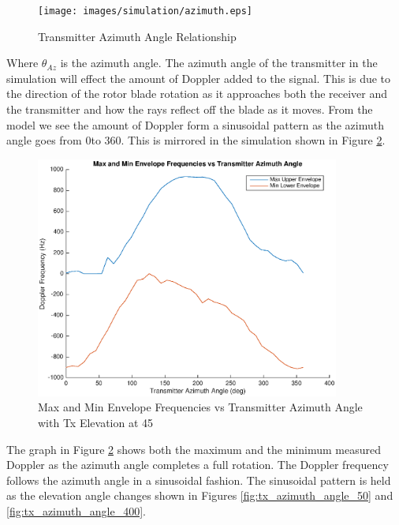 \begin{figure}
	\begin{center}
		\texttt{[image: images/simulation/azimuth.eps]}
		\caption{Transmitter Azimuth Angle Relationship}
		\label{fig:tx_azimuth_rel}
	\end{center}
\end{figure}

Where $\theta_{Az}$ is the azimuth angle. The azimuth angle of the transmitter in the simulation will effect the amount of Doppler added to the signal. This is due to the direction of the rotor blade rotation as it approaches both the receiver and the transmitter and how the rays reflect off the blade as it moves. From the model we see the amount of Doppler form a sinusoidal pattern as the azimuth angle goes from 0\textdegree \space to 360\textdegree. This is mirrored in the simulation shown in Figure \ref{fig:tx_azimuth_angle_200}.

\begin{figure}
	\begin{center}
		\includegraphics[width=10cm]{images/simulation/Azimuth_angle_200_max_doppler.eps}
		\caption{Max and Min Envelope Frequencies vs Transmitter Azimuth Angle with Tx Elevation at 45\textdegree}
		\label{fig:tx_azimuth_angle_200}
	\end{center}
\end{figure}

The graph in Figure \ref{fig:tx_azimuth_angle_200} shows both the maximum and the minimum measured Doppler as the azimuth angle completes a full rotation. The Doppler frequency follows the azimuth angle in a sinusoidal fashion. The sinusoidal pattern is held as the elevation angle changes shown in Figures \ref{fig:tx_azimuth_angle_50} and \ref{fig:tx_azimuth_angle_400}.

